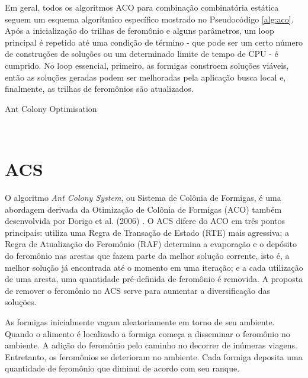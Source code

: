 Em geral, todos os algoritmos ACO para combinação combinatória estática seguem um esquema algorítmico específico mostrado no Pseudocódigo \ref{alg:aco}. Após a inicialização do trilhas de feromônio e alguns parâmetros, um loop principal é repetido até uma condição de término - que pode ser um certo número de construções de soluções ou um determinado limite de tempo de CPU - é cumprido. No loop essencial, primeiro, as formigas constroem soluções viáveis, então as soluções geradas podem ser melhoradas pela aplicação busca local e, finalmente, as trilhas de feromônios são atualizados.

\begin{algorithm}
	\caption{Ant Colony Optimisation}\label{alg:aco}
	\begin{algorithmic}[1]
		\small
        \
	\end{algorithmic}
\end{algorithm}

\section{ACS}
\label{sec-acs}

O algoritmo \textit{Ant Colony System}, ou Sistema de Colônia de Formigas, é  uma abordagem derivada da Otimização de Colônia de Formigas (ACO) também desenvolvida por Dorigo et al. (2006) \cite{dorigo2008particle}. O ACS difere do ACO em três pontos principais: utiliza uma Regra de Transação de Estado (RTE) mais agressiva; a Regra de Atualização do Feromônio (RAF) determina a evaporação e o depósito do feromônio nas arestas que fazem parte da melhor solução corrente, isto é, a melhor solução já encontrada até o momento em uma iteração; e a cada utilização de uma aresta, uma quantidade pré-definida de feromônio é removida. A proposta de remover o feromônio no ACS serve para aumentar a diversificação das soluções.

As formigas inicialmente vagam aleatoriamente em torno de seu ambiente. Quando o alimento é localizado a formiga começa a disseminar o feromônio no ambiente. A adição do feromônio pelo caminho no decorrer de inúmeras viagens. Entretanto, os feromônios se deterioram no ambiente. Cada formiga deposita uma quantidade de feromônio que diminui de acordo com seu ranque.

